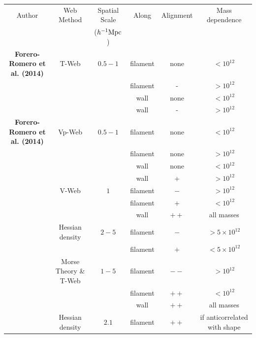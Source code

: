 \documentclass[usenatbib]{mn2e}
\newcommand{\hMpc}{{\ifmmode{h^{-1}{\rm Mpc}}\else{$h^{-1}$Mpc }\fi}}
\newcommand{\hMsun}{{\ifmmode{h^{-1}{\rm
        {M_{\odot}}}}\else{$h^{-1}{\rm{M_{\odot}}}$}\fi}}
\begin{document}
\begin{table}
\begin{tabular}{cccccc}\hline\hline
Author & Web Method & Spatial Scale& Along &
Alignment & Mass dependence\\
 & & ($\hMpc$)& & & \\\hline

{\bf Forero-Romero et al. (2014)} & T-Web & $0.5-1$ & 
filament &none & $<10^{12}$\hMsun\\

&   & & 
filament & - & $>10^{12}$\hMsun\\

&   & & 
wall & none & $<10^{12}$\hMsun\\

&   & & 
wall & - & $>10^{12}$\hMsun\\\hline

{\bf Forero-Romero et al. (2014)} & Vp-Web & $0.5-1$ & 
filament &none & $<10^{12}$\hMsun\\

&   & & 
filament & none & $>10^{12}$\hMsun\\

&   & & 
wall & none & $<10^{12}$\hMsun\\

&   & & 
wall & + & $>10^{12}$\hMsun\\\hline

\cite{Libeskind2013} & V-Web & $1$ & 
filament &$-$ & $>10^{12}$\hMsun\\

&   & & 
filament &$+$ & $<10^{12}$\hMsun\\

&   & & 
wall & $++$ & all masses\\\hline

\cite{Trowland2013} & Hessian density & $2-5$ & 
filament & $-$ & $> 5\times 10^{12}$\hMsun\\
&   & & 
filament & $+$ & $< 5\times 10^{12}$\hMsun\\\hline

\cite{Codis2012} & Morse Theory \& T-Web & $1-5$ & 
filament & $--$ & $>10^{12}$\hMsun \\ 

&   & & 
filament & $++$ & $<10^{12}$\hMsun \\ 

& & & 
wall & $++$ & all masses\\\hline

\cite{Zhang2009}  & Hessian density &  $2.1$ & 
filament & $++$ & if anticorrelated with shape\\


\end{tabular}
\end{table}
\end{document}
